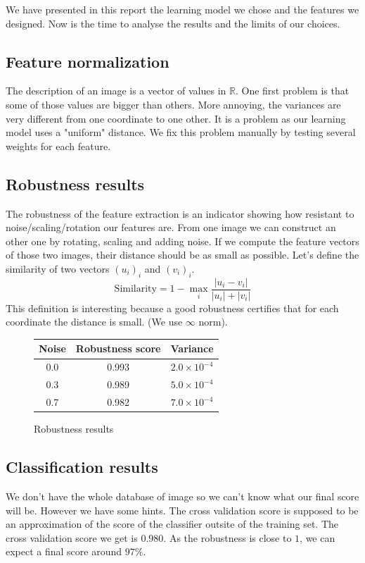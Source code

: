 \documentclass[a4paper, 11pt]{article}
\begin{document}
We have presented in this report the learning model we chose and the features we designed. Now is the time to analyse the results and the limits of our choices.

\subsection{Feature normalization}
The description of an image is a vector of values in $\mathbb R$. One first problem is that some of those values are bigger than others. More annoying, the variances are very different from one coordinate to one other. It is a problem as our learning model uses a "uniform" distance. We fix this problem manually by testing several weights for each feature.

\subsection{Robustness results}
The robustness of the feature extraction is an indicator showing how resistant to noise/scaling/rotation our features are. From one image we can construct an other one by rotating, scaling and adding noise. If we compute the feature vectors of those two images, their distance should be as small as possible. Let's define the similarity of two vectors $(u_i)_i$ and $(v_i)_i$.
\[\text{Similarity} = 1 - \max_i \frac{|u_i - v_i|}{|u_i| + |v_i|}\]
This definition is interesting because a good robustness certifies that for each coordinate the distance is small. (We use $\infty$ norm).
\begin{figure}[h!]
\centering
\begin{tabular}{|c|c|c|}
\hline
Noise & Robustness score & Variance \\
\hline
0.0 & 0.993 & $2.0 \times 10^{-4}$ \\
0.3 & 0.989 & $5.0 \times 10^{-4}$ \\
0.7 & 0.982 & $7.0 \times 10^{-4}$ \\
\hline
\end{tabular}
\caption{Robustness results}
\end{figure}

\subsection{Classification results}

We don't have the whole database of image so we can't know what our final score will be. However we have some hints. The cross validation score is supposed to be an approximation of the score of the classifier outsite of the training set. The cross validation score we get is $0.980$. As the robustness is close to $1$, we can expect a final score around $97\%$.
\end{document}
